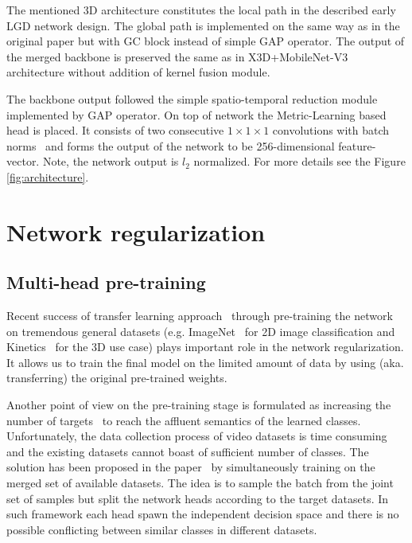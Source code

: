 \documentclass[twoside, twocolumn]{article}
\begin{document}
The mentioned 3D architecture constitutes the local path in the described early LGD network design. The global path is
implemented on the same way as in the original paper but with GC block instead of simple GAP operator. The output of the
merged backbone is preserved the same as in X3D+MobileNet-V3 architecture without addition of kernel fusion module.

The backbone output followed the simple spatio-temporal reduction module implemented by GAP operator. On top of network
the Metric-Learning based head is placed. It consists of two consecutive $1 \times 1 \times 1$ convolutions with batch
norms~\cite{BN} and forms the output of the network to be 256-dimensional feature-vector. Note, the network output is
$l_2$ normalized. For more details see the Figure \ref{fig:architecture}.



\section{Network regularization}

\subsection{Multi-head pre-training} \label{pre-training}

\lettrine[nindent=0em,lines=3]{R}{}ecent success of transfer learning approach~\cite{TransferLearning}
through pre-training the network on tremendous general datasets (e.g. ImageNet~\cite{ImageNet} for 2D image
classification and Kinetics~\cite{Kinetics} for the 3D use case) plays important role in the network regularization. It
allows us to train the final model on the limited amount of data by using (aka. transferring) the original pre-trained
weights.

Another point of view on the pre-training stage is formulated as increasing the number of targets~\cite{ImageNet-21k}
to reach the affluent semantics of the learned classes. Unfortunately, the data collection process of video datasets is
time consuming and the existing datasets cannot boast of sufficient number of classes. The solution has been proposed in
the paper~\cite{SplitML} by simultaneously training on the merged set of available datasets. The idea is to sample the
batch from the joint set of samples but split the network heads according to the target datasets. In such framework
each head spawn the independent decision space and there is no possible conflicting between similar classes in
different datasets.
\end{document}

